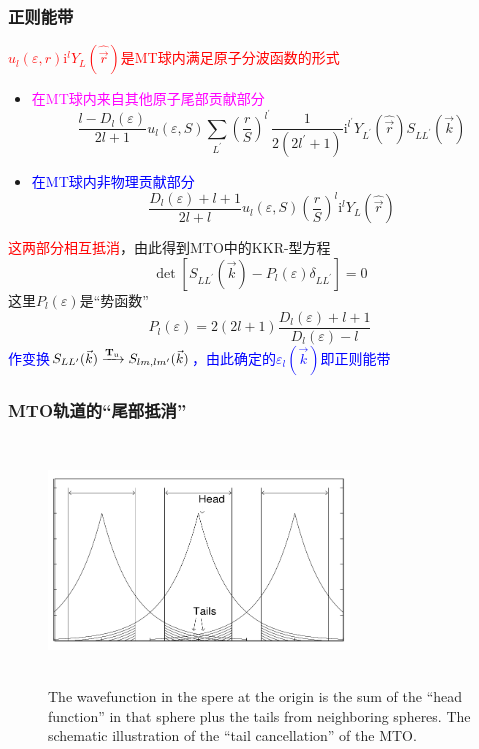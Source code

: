 \frame
{
	\frametitle{正则能带}
	\textcolor{red}{$u_l(\varepsilon,r)\mathrm{i}^lY_L(\hat{\vec r})$是\textrm{MT}球内满足原子分波函数的形式}
	\begin{itemize}
		\item \textcolor{magenta}{在\textrm{MT}球内来自其他原子尾部贡献部分}$$\dfrac{l-D_l(\varepsilon)}{2l+1}u_l(\varepsilon,S)\sum_{L^{\prime}}\left(\dfrac rS\right)^{l^{\prime}}\dfrac1{2(2l^{\prime}+1)}\mathrm{i}^{l^{\prime}}Y_{L^{\prime}}(\hat{\vec r})S_{LL^{\prime}}(\vec k)$$
		\item \textcolor{blue}{在\textrm{MT}球内非物理贡献部分}$$\dfrac{D_l(\varepsilon)+l+1}{2l+l}u_l(\varepsilon,S)\left(\dfrac rS\right)^l\mathrm{i}^lY_L(\hat{\vec r})$$
	\end{itemize}
	\textcolor{red}{这两部分相互抵消}，由此得到\textrm{MTO}中的\textrm{KKR}-型方程
	\begin{displaymath}
		\det[S_{LL^{\prime}}(\vec k)-P_l(\varepsilon)\delta_{LL^{\prime}}]=0
	\end{displaymath}
	这里$P_l(\varepsilon)$是“势函数”
	\begin{displaymath}
		P_l(\varepsilon)=2(2l+1)\dfrac{D_l(\varepsilon)+l+1}{D_l(\varepsilon)-l}
	\end{displaymath}
	\textcolor{blue}{作变换$S_{LL^{\prime}}(\vec k)\xrightarrow{\bf{T}\rm{_u}}S_{lm,lm^{\prime}}(\vec k)$，由此确定的$\varepsilon_l(\vec k)$即正则能带}
}

\frame
{
	\frametitle{\textrm{MTO}轨道的“尾部抵消”}
\begin{figure}[h!]
	\vspace*{-0.7in}
\centering
\includegraphics[height=2.55in,width=3.15in,viewport=0 0 845 635,clip]{Figures/MTO-Tail_cancellation.png}
\caption{\tiny \textrm{The wavefunction in the spere at the origin is the sum of the ``head function'' in that sphere plus the tails from neighboring spheres. The schematic illustration of the ``tail cancellation'' of the MTO.}}%
\label{MTO-tail-candellation}
\end{figure}
}

